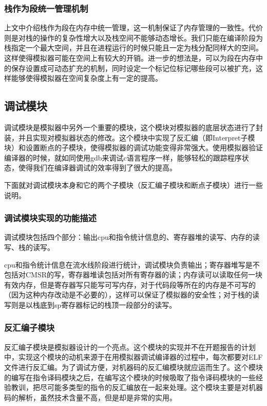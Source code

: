 \documentclass[12pt,a4paper]{article}
\begin{document}
\subsubsection{栈作为段统一管理机制}
上文中介绍栈作为段在内存中统一管理，这一机制保证了内存管理的一致性。代价则是对栈的操作的复杂性增大以及栈空间不能够动态增长。我们只能在编译阶段为栈指定一个最大空间，并且在进程运行的时候只能且一定为栈分配同样大的空间。这样使得模拟器可能在空间上有较大的开销。进一步的想法是，可以为段在内存中的保存设置成可动态扩充的机制，同时设定一个标记位标记哪些段可以被扩充，这样能够使得模拟器在空间复杂度上有一定的提高。


\subsection{调试模块}
调试模块是模拟器中另外一个重要的模块，这个模块对模拟器的底层状态进行了封装，并且实现对模拟器状态的修改。这个模块中实现了反汇编（即Interpret子模块）和设置断点的子模块，使得模拟器的调试功能变得非常强大。使用模拟器验证编译器的时候，就如同使用gdb来调试c语言程序一样，能够轻松的跟踪程序状态，使得我们在编译器调试的效率得到了很大的提高。

下面就对调试模块本身和它的两个子模块（反汇编子模块和断点子模块）进行一些说明。

\subsubsection{调试模块实现的功能描述}
调试模块包括四个部分：输出cpu和指令统计信息的、寄存器堆的读写、内存的读写、栈的读写。

cpu和指令统计信息在流水线阶段进行统计，调试模块负责输出；寄存器堆写是不包括对CMSR的写，寄存器堆读包括对所有寄存器的读；内存读可以读取任何一块有效内存，但是寄存器写只能写可写内存，对于代码段等所在的内存是不可写的（因为这种内存改动是不必要的），这样可以保证了模拟器的安全性；对于栈的读写则是以栈底到sp寄存器标记的栈顶一段部分的读写。

\subsubsection{反汇编子模块}
反汇编子模块是模拟器设计的一个亮点。这个模块的实现并不在开题报告的计划中，实现这个模块的动机来源于在用模拟器调试编译器的过程中，每次都要对ELF文件进行反汇编。为了调试方便，对机器码的反汇编模块就应运而生了。这个模块的编写在指令译码模块之后，在编写这个模块的时候吸取了指令译码模块的一些经验教训，把尽可能多类型的指令的反汇编放在一起来处理。这个模块主要是对机器码的解析，虽然技术含量不高，但是却是非常的实用。
\end{document}
